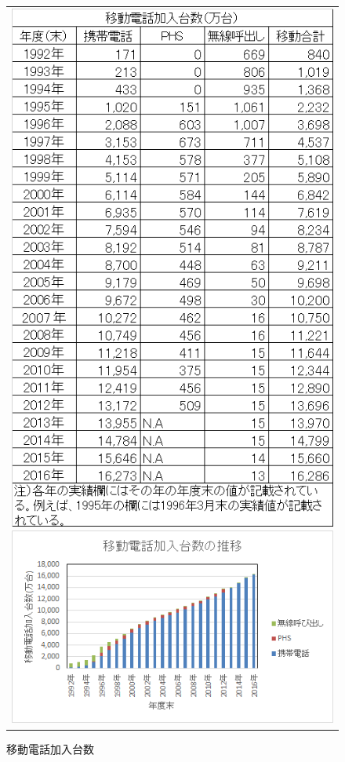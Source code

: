 \documentclass[uplatex, titlepage]{jsarticle}
\begin{document}
\begin{figure}[H]
  \centering
    \begin{tabular}{c}
      \begin{minipage}{0.5\hsize}
        \begin{center}
          \includegraphics[scale=0.7]{./re2/f11.png}
          \caption{移動電話加入台数}
          \label{fig:table1}
        \end{center}
      \end{minipage}
      \begin{minipage}{0.5\hsize}
        \begin{center}
          \includegraphics[scale = 0.9]{./re2/f1.png}

\end{center}
\end{minipage}
\end{tabular}
\end{figure}
\end{document}
